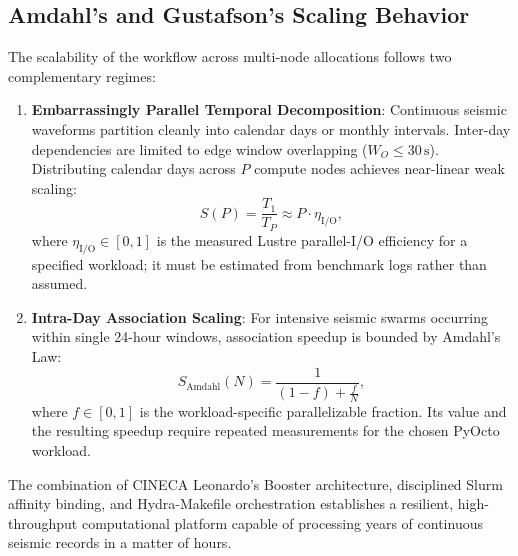 \subsection{Amdahl's and Gustafson's Scaling Behavior}
The scalability of the workflow across multi-node allocations follows two complementary regimes:
\begin{enumerate}
  \item \textbf{Embarrassingly Parallel Temporal Decomposition}: Continuous seismic waveforms partition cleanly into calendar days or monthly intervals. Inter-day dependencies are limited to edge window overlapping ($W_O \le 30\,\mathrm{s}$). Distributing calendar days across $P$ compute nodes achieves near-linear weak scaling:
  \begin{equation}
    S(P) = \frac{T_1}{T_P} \approx P \cdot \eta_{\mathrm{I/O}},
  \end{equation}
  where $\eta_{\mathrm{I/O}} \in [0,1]$ is the measured Lustre parallel-I/O efficiency for a specified workload; it must be estimated from benchmark logs rather than assumed.
  \item \textbf{Intra-Day Association Scaling}: For intensive seismic swarms occurring within single 24-hour windows, association speedup is bounded by Amdahl's Law:
  \begin{equation}
    S_{\mathrm{Amdahl}}(N) = \frac{1}{(1 - f) + \frac{f}{N}},
  \end{equation}
  where $f \in [0,1]$ is the workload-specific parallelizable fraction. Its value and the resulting speedup require repeated measurements for the chosen PyOcto workload.
\end{enumerate}

The combination of CINECA Leonardo's Booster architecture, disciplined Slurm affinity binding, and Hydra-Makefile orchestration establishes a resilient, high-throughput computational platform capable of processing years of continuous seismic records in a matter of hours.
